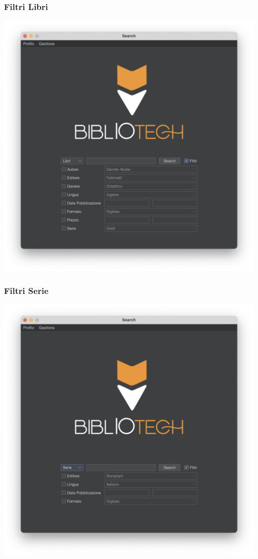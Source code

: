 \subsubsection{Filtri Libri}
\includegraphics[scale=0.25]{Immagini/Schermate/Search/SearchPage-FiltriLibro.png}
\subsubsection{Filtri Serie}
\includegraphics[scale=0.25]{Immagini/Schermate/Search/SearchPage-FiltriSerie.png}
